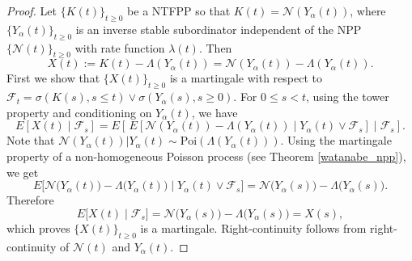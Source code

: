 \documentclass[11pt,oneside,reqno]{amsart}
\theoremstyle{definition}
\theoremstyle{remarkstyle}
\begin{document}
\begin{proof}
    Let $\{K(t)\}_{t\ge 0}$ be a NTFPP so that $K(t)=\mathcal{N}\left(Y_{\alpha}(t)\right)$, where $\{Y_{\alpha}(t)\}_{t\ge 0}$ is an inverse stable subordinator independent of the NPP $\{\mathcal{N}(t)\}_{t\ge 0}$ with rate function $\lambda(t)$. Then
\begin{equation*}
    X(t):=K(t)-\Lambda\left(Y_\alpha(t)\right)=\mathcal{N}\left(Y_\alpha(t)\right)-\Lambda\left(Y_\alpha(t)\right).
\end{equation*}
First we show that $\{X(t)\}_{t\ge 0}$ is a martingale with respect to $\mathcal{F}_t=\sigma\left(K(s),s\le t\right)\vee\sigma\left(Y_{\alpha}(s), s\ge 0\right)$. For \(0\le s<t\), using the tower property and conditioning on $Y_\alpha(t)$, we have
\begin{equation*}
    E\left[X(t)\mid\mathcal F_s\right]
=E\left[\,E\left[\mathcal{N}\left(Y_\alpha(t)\right)-\Lambda\left(Y_\alpha(t)\right)\;\big|\;Y_\alpha(t)\vee\mathcal F_s\right]\;\Big|\;\mathcal F_s\right].
\end{equation*}
Note that $\mathcal{N}(Y_\alpha(t))|Y_\alpha(t)\sim \text{Poi}(\Lambda(Y_\alpha(t)))$. 
Using the martingale property of a non-homogeneous Poisson process (see Theorem \ref{watanabe_npp}), we get
\[
E\big[\mathcal{N}\big(Y_\alpha(t)\big)-\Lambda\big(Y_\alpha(t)\big)\;\big|\;Y_\alpha(t)\vee\mathcal F_s\big]
= \mathcal{N}\big(Y_\alpha(s)\big)-\Lambda\big(Y_\alpha(s)\big).
\]
Therefore
\[
E\big[X(t)\mid\mathcal F_s\big]=\mathcal{N}\big(Y_\alpha(s)\big)-\Lambda\big(Y_\alpha(s)\big)=X(s),
\]
which proves $\{X(t)\}_{t\ge 0}$ is a martingale. Right-continuity follows from right-continuity of $\mathcal{N}(t)$ and $Y_\alpha(t)$.
   

\end{proof}
\end{document}
